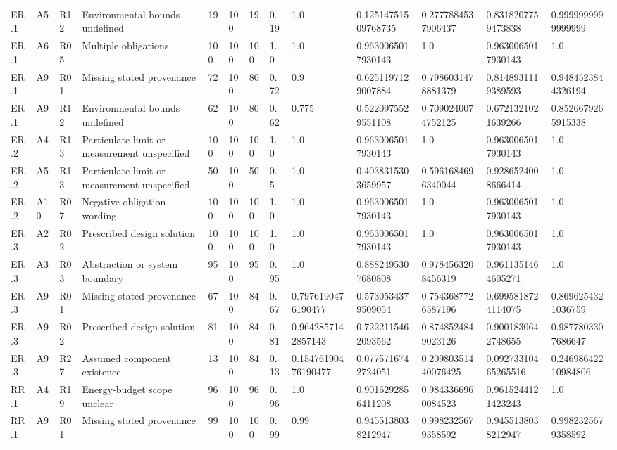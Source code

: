 \begin{tabular}{lllllllllllll}
ER.1 & A5 & R12 & Environmental bounds undefined & 19 & 100 & 19 & 0.19 & 1.0 & 0.12514751509768735 & 0.2777884537906437 & 0.8318207759473838 & 0.9999999999999999 \\
ER.1 & A6 & R05 & Multiple obligations & 100 & 100 & 100 & 1.0 & 1.0 & 0.9630065017930143 & 1.0 & 0.9630065017930143 & 1.0 \\
ER.1 & A9 & R01 & Missing stated provenance & 72 & 100 & 80 & 0.72 & 0.9 & 0.6251197129007884 & 0.7986031478881379 & 0.8148931119389593 & 0.9484523844326194 \\
ER.1 & A9 & R12 & Environmental bounds undefined & 62 & 100 & 80 & 0.62 & 0.775 & 0.5220975529551108 & 0.7090240074752125 & 0.6721321021639266 & 0.8526679265915338 \\
ER.2 & A4 & R13 & Particulate limit or measurement unspecified & 100 & 100 & 100 & 1.0 & 1.0 & 0.9630065017930143 & 1.0 & 0.9630065017930143 & 1.0 \\
ER.2 & A5 & R13 & Particulate limit or measurement unspecified & 50 & 100 & 50 & 0.5 & 1.0 & 0.4038315303659957 & 0.5961684696340044 & 0.9286524008666414 & 1.0 \\
ER.2 & A10 & R07 & Negative obligation wording & 100 & 100 & 100 & 1.0 & 1.0 & 0.9630065017930143 & 1.0 & 0.9630065017930143 & 1.0 \\
ER.3 & A2 & R02 & Prescribed design solution & 100 & 100 & 100 & 1.0 & 1.0 & 0.9630065017930143 & 1.0 & 0.9630065017930143 & 1.0 \\
ER.3 & A3 & R03 & Abstraction or system boundary & 95 & 100 & 95 & 0.95 & 1.0 & 0.8882495307680808 & 0.9784563208456319 & 0.9611351464605271 & 1.0 \\
ER.3 & A9 & R01 & Missing stated provenance & 67 & 100 & 84 & 0.67 & 0.7976190476190477 & 0.5730534379509054 & 0.7543687726587196 & 0.6995818724114075 & 0.8696254321036759 \\
ER.3 & A9 & R02 & Prescribed design solution & 81 & 100 & 84 & 0.81 & 0.9642857142857143 & 0.7222115462093562 & 0.8748524849023126 & 0.9001830642748655 & 0.9877803307686647 \\
ER.3 & A9 & R27 & Assumed component existence & 13 & 100 & 84 & 0.13 & 0.15476190476190477 & 0.0775716742724051 & 0.20980351440076425 & 0.09273310465265516 & 0.24698642210984806 \\
RR.1 & A4 & R19 & Energy-budget scope unclear & 96 & 100 & 96 & 0.96 & 1.0 & 0.9016292856411208 & 0.9843366960084523 & 0.9615244121423243 & 1.0 \\
RR.1 & A9 & R01 & Missing stated provenance & 99 & 100 & 100 & 0.99 & 0.99 & 0.9455138038212947 & 0.9982325679358592 & 0.9455138038212947 & 0.9982325679358592 \\

\end{tabular}
